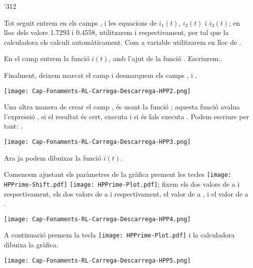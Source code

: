 \begin{exemple}
\begin{dingautolist}{'312}
        \item Tot seguit entrem en els camps ,  i  les equacions de $i_1(t)$, $i_2(t)$ i $i_3(t)$; en lloc dels valors \num{1,7293} i  \num{0,4558}, utilitzarem  i  respectivament, per tal que la calculadora els calculi automàticament. Com a variable utilitzarem  en lloc de .

            En el camp  entrem la funció $i(t)$, amb l'ajut de la funció  . Escriurem:\break {}.

            Finalment, deixem marcat el camp  i desmarquem els camps ,  i .

            \texttt{[image: Cap-Fonaments-RL-Carrega-Descarrega-HPP2.png]}

            Una altra manera de crear el camp , és usant la funció ; aquesta funció avalua l'expressió , si el resultat   és cert, executa  i si és fals  executa . Podem escriure per tant: .

            \texttt{[image: Cap-Fonaments-RL-Carrega-Descarrega-HPP3.png]}

        \item Ara ja podem dibuixar la funció $i(t)$.

            Comencem ajustant els paràmetres de la gràfica prement les tecles \texttt{[image: HPPrime-Shift.pdf]} \texttt{[image: HPPrime-Plot.pdf]}; fixem els dos valors de  a  i  respectivament, els dos valors de  a  i  respectivament, el valor de  a , i el valor de  a .

            \texttt{[image: Cap-Fonaments-RL-Carrega-Descarrega-HPP4.png]}

        \item A continuació premem la tecla \texttt{[image: HPPrime-Plot.pdf]} i la calculadora dibuixa la gràfica.

            \texttt{[image: Cap-Fonaments-RL-Carrega-Descarrega-HPP5.png]}
    \end{dingautolist}
\end{exemple}


